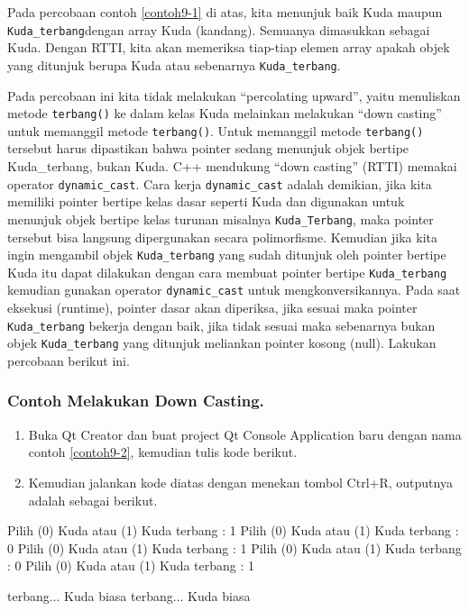 Pada percobaan contoh \ref{contoh9-1} di atas, kita menunjuk baik Kuda maupun
\texttt{Kuda\_terbang}dengan array Kuda (kandang). Semuanya dimasukkan
sebagai Kuda. Dengan RTTI, kita akan memeriksa tiap-tiap elemen array
apakah objek yang ditunjuk berupa Kuda atau sebenarnya
\texttt{Kuda\_terbang}.

Pada percobaan ini kita tidak melakukan ``percolating upward'', yaitu
menuliskan metode \texttt{terbang()} ke dalam kelas Kuda melainkan
melakukan ``down casting'' untuk memanggil metode \texttt{terbang()}.
Untuk memanggil metode \texttt{terbang()} tersebut harus dipastikan
bahwa pointer sedang menunjuk objek bertipe Kuda\_terbang, bukan Kuda.
C++ mendukung ``down casting'' (RTTI) memakai operator
\texttt{dynamic\_cast}. Cara kerja \texttt{dynamic\_cast} adalah
demikian, jika kita memiliki pointer bertipe kelas dasar seperti Kuda
dan digunakan untuk menunjuk objek bertipe kelas turunan misalnya
\texttt{Kuda\_Terbang}, maka pointer tersebut bisa langsung dipergunakan
secara polimorfisme. Kemudian jika kita ingin mengambil objek
\texttt{Kuda\_terbang} yang sudah ditunjuk oleh pointer bertipe Kuda itu
dapat dilakukan dengan cara membuat pointer bertipe
\texttt{Kuda\_terbang} kemudian gunakan operator \texttt{dynamic\_cast}
untuk mengkonversikannya. Pada saat eksekusi (runtime), pointer dasar
akan diperiksa, jika sesuai maka pointer \texttt{Kuda\_terbang} bekerja
dengan baik, jika tidak sesuai maka sebenarnya bukan objek
\texttt{Kuda\_terbang} yang ditunjuk meliankan pointer kosong (null).
Lakukan percobaan berikut ini.

\subsubsection*{Contoh  Melakukan Down Casting.}

\begin{enumerate}

\item
  Buka Qt Creator dan buat project Qt Console Application baru dengan
  nama contoh \ref{contoh9-2}, kemudian tulis kode berikut.




\item
  Kemudian jalankan kode diatas dengan menekan tombol Ctrl+R, outputnya
  adalah sebagai berikut.
\end{enumerate}

\begin{lcverbatim}
Pilih (0) Kuda atau (1) Kuda terbang : 1
Pilih (0) Kuda atau (1) Kuda terbang : 0
Pilih (0) Kuda atau (1) Kuda terbang : 1
Pilih (0) Kuda atau (1) Kuda terbang : 0
Pilih (0) Kuda atau (1) Kuda terbang : 1

terbang...
Kuda biasa
terbang...
Kuda biasa
\end{lcverbatim}

